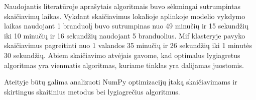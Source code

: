 \documentclass{VUMIFPSkursinis}
\begin{document}
	Naudojantis literatūroje aprašytais algoritmais\cite{Lygeg} buvo sėkmingai sutrumpintas skaičiavimų laikas.
	Vykdant skaičiavimus lokalioje aplinkoje modelio vykdymo laikas naudojant 1 branduolį buvo sutrumpinas nuo 49 minučių ir 15 sekundžių iki 10 minučių ir 16 sekundžių naudojant 5 branduolius.
	Mif klasteryje pavyko skaičiavimus pagreitinti nuo 1 valandos 35 minučių ir 26 sekundžių iki 1 minutės 30 sekundžių.
	Abiem skaičiavimo atvėjais gavome, kad optimalus lygiagretus algoritmas yra vienmatis algoritmas, kuriame tinklas yra dalijamas juostomis.


	Ateityje būtų galima analizuoti NumPy optimizacijų įtaką skaičiavimams ir skirtingus skaitinius metodus bei lygiagrečius algoritmus.
	
	
	
\pagebreak

\printbibliography[heading=bibintoc]
\pagebreak
\end{document}
